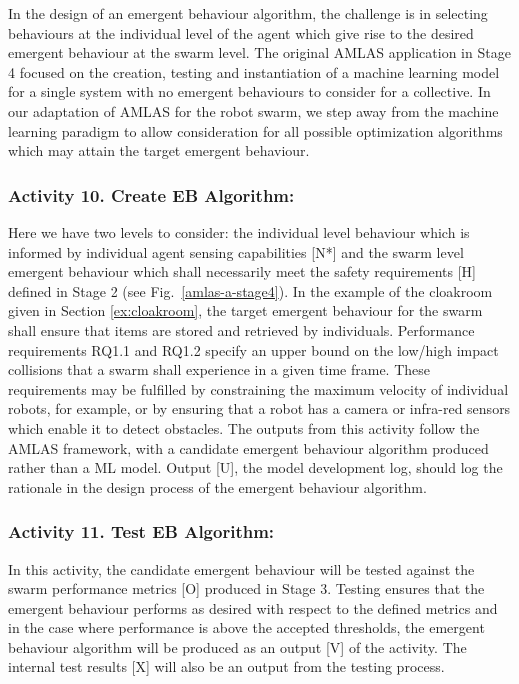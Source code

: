 \documentclass[lettersize,journal]{IEEEtran}
\begin{document}
In the design of an emergent behaviour algorithm, the challenge is in selecting behaviours at the individual level of the agent which give rise to the desired emergent behaviour at the swarm level. The original AMLAS application in Stage 4 focused on the creation, testing and instantiation of a machine learning model for a single system with no emergent behaviours to consider for a collective. In our adaptation of AMLAS for the robot swarm,  we step away from the machine learning paradigm to allow consideration for all possible optimization algorithms which may attain the target emergent behaviour.

\subsubsection*{Activity 10. Create EB Algorithm:}

Here we have two levels to consider: the individual level behaviour which is informed by individual agent sensing capabilities [N*] and the swarm level emergent behaviour which shall necessarily meet the safety requirements [H] defined in Stage 2 (see Fig.~\ref{amlas-a-stage4}). In the example of the cloakroom given in Section \ref{ex:cloakroom}, the target emergent behaviour for the swarm shall ensure that items are stored and retrieved by individuals. Performance requirements RQ1.1 and RQ1.2 specify an upper bound on the low/high impact collisions that a swarm shall experience in a given time frame. These requirements may be fulfilled by constraining the maximum velocity of individual robots, for example, or by ensuring that a robot has a camera or infra-red sensors which enable it to detect obstacles. The outputs from this activity follow the AMLAS framework, with a candidate emergent behaviour algorithm produced rather than a ML model. Output [U], the model development log, should log the rationale in the design process of the emergent behaviour algorithm.

\subsubsection*{Activity 11. Test EB Algorithm:}

In this activity, the candidate emergent behaviour will be tested against the swarm performance metrics [O] produced in Stage 3. Testing ensures that the emergent behaviour performs as desired with respect to the defined metrics and in the case where performance is above the accepted thresholds, the emergent behaviour algorithm will be produced as an output [V] of the activity. The internal test results [X] will also be an output from the testing process.
\end{document}
